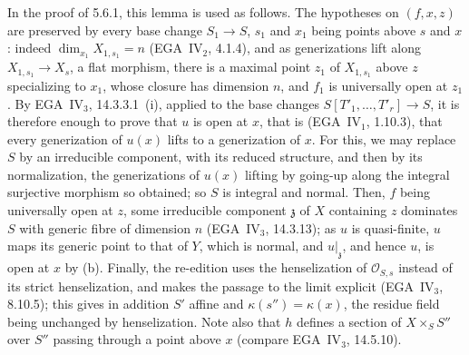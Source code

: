 In the proof of 5.6.1, this lemma is used as follows. The hypotheses on \((f,x,z)\) are preserved by every base
change \(S_1\to S\), \(s_1\) and \(x_1\) being points above \(s\) and \(x\): indeed \(\dim_{x_1}X_{1,s_1}=n\)
(EGA~IV\(_2\), 4.1.4), and as generizations lift along \(X_{1,s_1}\to X_s\), a flat morphism, there is a
maximal point \(z_1\) of \(X_{1,s_1}\) above \(z\) specializing to \(x_1\), whose closure has dimension \(n\),
and \(f_1\) is universally open at \(z_1\). By EGA~IV\(_3\), 14.3.3.1~(i), applied to the base changes
\(S[T'_1,\ldots,T'_r]\to S\), it is therefore enough to prove that \(u\) is open at \(x\), that is
(EGA~IV\(_1\), 1.10.3), that every generization of \(u(x)\) lifts to a generization of \(x\). For this, we may
replace \(S\) by an irreducible component, with its reduced structure, and then by its normalization, the
generizations of \(u(x)\) lifting by going-up along the integral surjective morphism so obtained; so \(S\) is
integral and normal. Then, \(f\) being universally open at \(z\), some irreducible component \(\mathfrak z\) of
\(X\) containing \(z\) dominates \(S\) with generic fibre of dimension \(n\) (EGA~IV\(_3\), 14.3.13); as \(u\)
is quasi-finite, \(u\) maps its generic point to that of \(Y\), which is normal, and \(u|_{\mathfrak z}\), and
hence \(u\), is open at \(x\) by (b). Finally, the re-edition uses the henselization of \(\mathcal O_{S,s}\)
instead of its strict henselization, and makes the passage to the limit explicit (EGA~IV\(_3\), 8.10.5); this
gives in addition \(S'\) affine and \(\kappa(s'')=\kappa(x)\), the residue field being unchanged by
henselization. Note also that \(h\) defines a section of \(X\times_SS''\) over \(S''\) passing through a point
above \(x\) (compare EGA~IV\(_3\), 14.5.10).
\par\medskip
